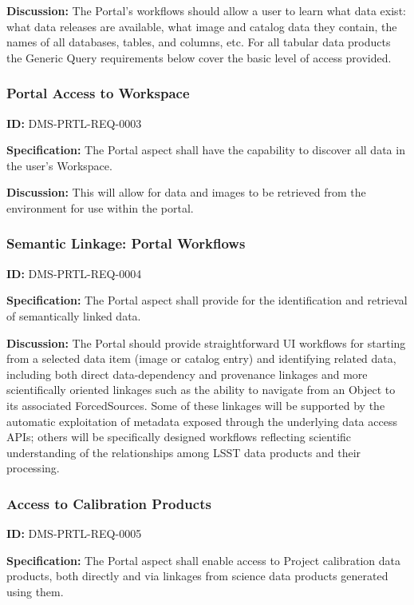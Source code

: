 \documentclass[SE,toc]{lsstdoc}
\begin{document}
\textbf{Discussion:}
The Portal's workflows should allow a user to learn what data exist: what data releases are available, what image and catalog data they contain, the names of all databases, tables, and columns, etc.
For all tabular data products the Generic Query requirements below cover the basic level of access provided.

\subsubsection{Portal Access to Workspace}

\label{DMS-PRTL-REQ-0003}
\textbf{ID:} DMS-PRTL-REQ-0003

\textbf{Specification:}
The Portal aspect shall have the capability to discover all data in the user's Workspace.

\textbf{Discussion:}
This will allow for data and images to be retrieved from the environment for use within the portal.

\subsubsection{Semantic Linkage: Portal Workflows}

\label{DMS-PRTL-REQ-0004}
\textbf{ID:} DMS-PRTL-REQ-0004

\textbf{Specification:}
The Portal aspect shall provide for the identification and retrieval of semantically linked data.

\textbf{Discussion:}
The Portal should provide straightforward UI workflows for starting from a selected data item (image or catalog entry) and identifying related data, including both direct data-dependency and provenance linkages and more scientifically oriented linkages such as the ability to navigate from an Object to its associated ForcedSources.
Some of these linkages will be supported by the automatic exploitation of metadata exposed through the underlying data access APIs; others will be specifically designed workflows reflecting scientific understanding of the relationships among LSST data products and their processing.

\subsubsection{Access to Calibration Products}

\label{DMS-PRTL-REQ-0005}
\textbf{ID:} DMS-PRTL-REQ-0005

\textbf{Specification:}
The Portal aspect shall enable access to Project calibration data products, both directly and via linkages from science data products generated using them.
\end{document}

